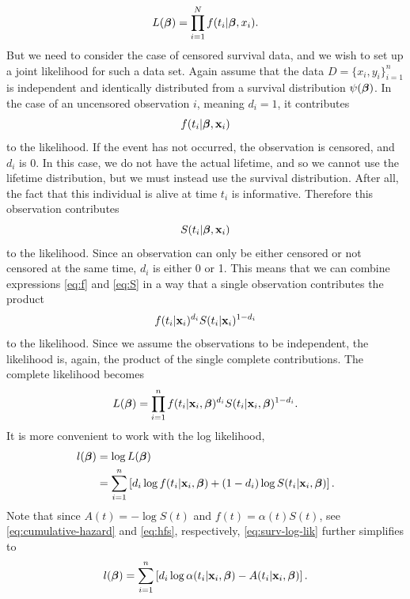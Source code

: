 \begin{equation}
    L(\boldsymbol{\beta})=\prod_{i=1}^N f(t_i|\boldsymbol{\beta},x_i).
\end{equation}
But we need to consider the case of censored survival data, and we wish to set up a joint likelihood for such a data set.
Again assume that the data $D=\{x_i,y_i\}_{i=1}^n$ is independent and identically distributed from a survival distribution $\psi(\boldsymbol{\beta})$.
In the case of an uncensored observation $i$, meaning $d_i=1$, it contributes
\begin{equation}\label{eq:f}
    f(t_i|\boldsymbol{\beta},\mathbf{x}_{i})
\end{equation}
to the likelihood. If the event has not occurred, the observation is censored, and $d_i$ is 0. In this case, we do not have the actual lifetime, and so we cannot use the lifetime distribution, but we must instead use the survival distribution.
After all, the fact that this individual is alive at time $t_i$ is informative.
Therefore this observation contributes
\begin{equation}\label{eq:S}
    S(t_i|\boldsymbol{\beta},\mathbf{x}_{i})
\end{equation}
to the likelihood. Since an observation can only be either censored or not censored at the same time, $d_i$ is either 0 or 1. This means that we can combine expressions \eqref{eq:f} and \eqref{eq:S} in a way that a single observation contributes the product
\begin{equation*}
    f(t_{i}|\mathbf{x}_i)^{d_i}S(t_{i}|\mathbf{x}_i)^{1-d_i}
\end{equation*}
to the likelihood. Since we assume the observations to be independent, the likelihood is, again, the product of the single complete contributions. The complete likelihood becomes
\begin{equation}\label{eq:surv-lik}
    L(\boldsymbol{\beta})=\prod_{i=1}^n f(t_i|\mathbf{x}_i,\boldsymbol{\beta})^{d_i} S(t_i|\mathbf{x}_i,\boldsymbol{\beta})^{1-d_i}.
\end{equation}
It is more convenient to work with the log likelihood,
\begin{align}\label{eq:surv-log-lik}
\begin{split}
    l(\boldsymbol{\beta})&=\log L(\boldsymbol{\beta}) \\
    &=\sum_{i=1}^n\left[ d_i \log f(t_i|\mathbf{x}_i,\boldsymbol{\beta}) + (1-d_i)\log S(t_i|\mathbf{x}_i,\boldsymbol{\beta})\right].
\end{split}
\end{align}
Note that since $A(t)=-\log S(t)$ and $f(t)=\alpha(t)S(t)$, see \eqref{eq:cumulative-hazard} and \eqref{eq:hfs}, respectively, \eqref{eq:surv-log-lik} further simplifies to
\begin{equation*}
    l(\boldsymbol{\beta})=\sum_{i=1}^n\left[ d_i \log \alpha(t_i|\mathbf{x}_i,\boldsymbol{\beta}) - A(t_i|\mathbf{x}_i,\boldsymbol{\beta})\right].
\end{equation*}


